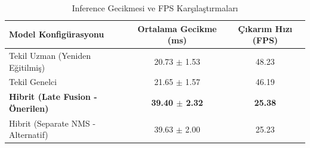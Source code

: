 \begin{table}[htbp]
\caption{Inference Gecikmesi ve FPS Karşılaştırmaları}
\label{tab:inference_speed}
\centering
\begin{tabular}{lcc}
\hline
\textbf{Model Konfigürasyonu} & \textbf{Ortalama Gecikme (ms)} & \textbf{Çıkarım Hızı (FPS)} \\ \hline
Tekil Uzman (Yeniden Eğitilmiş) & 20.73 $\pm$ 1.53 & 48.23 \\
Tekil Genelci & 21.65 $\pm$ 1.57 & 46.19 \\
\textbf{Hibrit (Late Fusion - Önerilen)} & \textbf{39.40 $\pm$ 2.32} & \textbf{25.38} \\
Hibrit (Separate NMS - Alternatif) & 39.63 $\pm$ 2.00 & 25.23 \\
\hline
\end{tabular}
\end{table}
